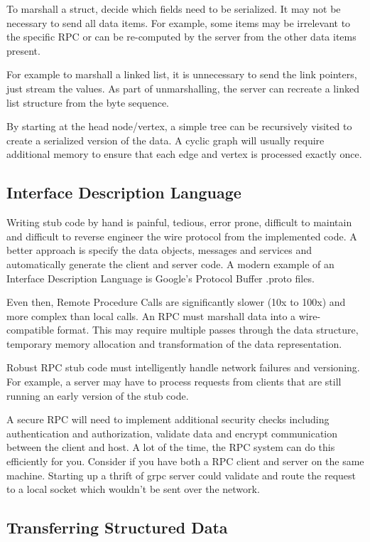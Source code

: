 To marshall a struct, decide which fields need to be serialized.
It may not be necessary to send all data items.
For example, some items may be irrelevant to the specific RPC or can be re-computed by the server from the other data items present.

For example to marshall a linked list, it is unnecessary to send the link pointers, just stream the values.
As part of unmarshalling, the server can recreate a linked list structure from the byte sequence.

By starting at the head node/vertex, a simple tree can be recursively visited to create a serialized version of the data.
A cyclic graph will usually require additional memory to ensure that each edge and vertex is processed exactly once.

\subsection{Interface Description Language}

Writing stub code by hand is painful, tedious, error prone, difficult to maintain and difficult to reverse engineer the wire protocol from the implemented code.
A better approach is specify the data objects, messages and services and automatically generate the client and server code.
A modern example of an Interface Description Language is Google's Protocol Buffer .proto files.

Even then, Remote Procedure Calls are significantly slower (10x to 100x) and more complex than local calls.
An RPC must marshall data into a wire-compatible format.
This may require multiple passes through the data structure, temporary memory allocation and transformation of the data representation.

Robust RPC stub code must intelligently handle network failures and versioning.
For example, a server may have to process requests from clients that are still running an early version of the stub code.

A secure RPC will need to implement additional security checks including authentication and authorization, validate data and encrypt communication between the client and host.
A lot of the time, the RPC system can do this efficiently for you. Consider if you have both a RPC client and server on the same machine.
Starting up a thrift of grpc server could validate and route the request to a local socket which wouldn't be sent over the network.

\subsection{Transferring Structured Data}

